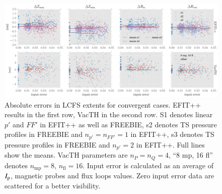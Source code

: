 

\begin{figure}[!htb]
\centering   %
\hfill{}
\includegraphics[width=18cm]{figures/RZstats.pdf}
\hfill{}
\caption{Absolute errors in LCFS extents for convergent cases. EFIT++ results in the first row, VacTH in the second row. S1 denotes linear $p'$ and $FF'$ in EFIT++ as well as FREEBIE, s2 denotes TS pressure profiles in FREEBIE and $n_{p'} = n_{FF'} = 1$ in EFIT++, s3 denotes TS pressure profiles in FREEBIE and $n_{p'} = 2$ in EFIT++. Full lines show the means. VacTH parameters are $n_P=n_Q=4$, ``8 mp, 16 fl'' denotes $n_\mathrm{mp}=8$, $n_\mathrm{fl}=16$. Input error is calculated as an average of $I_{\rm{p}}$, magnetic probes and flux loops values. Zero input error data are scattered for a better visibility.}
\label{fig:RZstats}
\end{figure}

